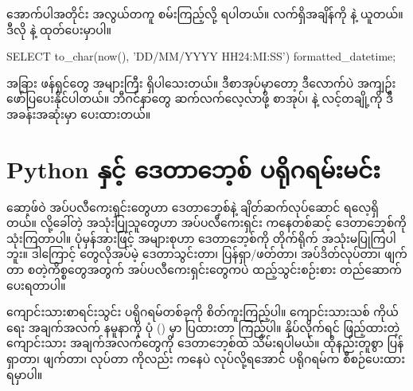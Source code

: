 အောက်ပါအတိုင်း အလွယ်တကူ စမ်းကြည့်လို့ ရပါတယ်။ လက်ရှိအချိန်ကို  နဲ့ ယူတယ်။ ဒီလို   နဲ့ ထုတ်ပေးမှာပါ။
%
\begin{sql}
SELECT to_char(now(), 'DD/MM/YYYY HH24:MI:SS') formatted_datetime;
\end{sql}
%

အခြား ဖန်ရှင်တွေ အများကြီး ရှိပါသေးတယ်။ ဒီစာအုပ်မှာတော့ ဒီလောက်ပဲ အကျဉ်း ဖော်ပြပေးနိုင်ပါတယ်။ ဘီဂင်နာတွေ ဆက်လက်လေ့လာဖို့ စာအုပ်၊  နဲ့  လင့်တချို့ကို ဒီအခန်းအဆုံးမှာ ပေးထားတယ်။ 


\section{Python နှင့် ဒေတာဘေ့စ် ပရိုဂရမ်းမင်း}
ဆော့ဖ်ဝဲ အပ်ပလီကေးရှင်းတွေဟာ ဒေတာဘေ့စ်နဲ့ ချိတ်ဆက်လုပ်ဆောင် ရလေ့ရှိတယ်။  လို့ခေါ်တဲ့ အသုံးပြုသူတွေဟာ အပ်ပလီကေးရှင်း  ကနေတစ်ဆင့် ဒေတာဘေ့စ်ကို သုံးကြတာပါ။ ပုံမှန်အားဖြင့်  အများစုဟာ ဒေတာဘေ့စ်ကို တိုက်ရိုက် အသုံးမပြုကြပါဘူး။ ဒါကြောင့်  တွေလိုအပ်မဲ့ ဒေတာသွင်းတာ၊ ပြန်ရှာ/ဖတ်တာ၊ အပ်ဒိတ်လုပ်တာ၊ ဖျက်တာ စတဲ့ကိစ္စတွေအတွက် အပ်ပလီကေးရှင်းတွေကပဲ ထည့်သွင်းစဉ်းစား တည်ဆောက်ပေးရတာပါ။ 

ကျောင်းသားစာရင်းသွင်း ပရိုဂရမ်တစ်ခုကို စိတ်ကူးကြည့်ပါ။ ကျောင်းသားသစ် ကိုယ်ရေး အချက်အ\allowbreak လက်  နမူနာကို ပုံ (\fRefNo{\ref{fig:stuform}}) မှာ ပြထားတာ ကြည့်ပါ။  နှိပ်လိုက်ရင် ဖြည့်ထားတဲ့ ကျောင်းသား အချက်အလက်တွေကို ဒေတာဘေ့စ်ထဲ သိမ်းရပါမယ်။ ထိုနည်းတူစွာ ပြန်ရှာတာ၊ ဖျက်တာ၊  လုပ်တာ ကိုလည်း  ကနေပဲ လုပ်လို့ရအောင် ပရိုဂရမ်က စီစဉ်ပေးထားရမှာပါ။ 
%
\begin{figure}[tbh!]
\caption{} 
\label{fig:stuform}
\end{figure}
%

